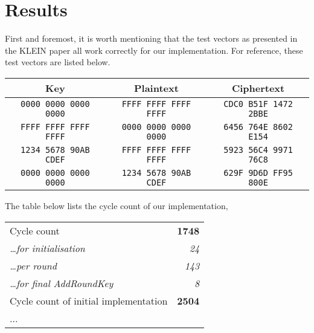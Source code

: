 \documentclass[a4paper]{article}
\begin{document}
\section{Results}

First and foremost, it is worth mentioning that the test vectors as presented in the KLEIN paper all work correctly for our implementation. For reference, these test vectors are listed below.

\begin{center}
	\begin{tabular}{c | c | c}
		\hline
		Key & Plaintext & Ciphertext \\
		\hline
	{\tt \small 0000 0000 0000 0000} & {\tt \small FFFF FFFF FFFF FFFF} & {\tt \small CDC0 B51F 1472 2BBE} \\
	{\tt \small FFFF FFFF FFFF FFFF} & {\tt \small 0000 0000 0000 0000} & {\tt \small 6456 764E 8602 E154} \\
	{\tt \small 1234 5678 90AB CDEF} & {\tt \small FFFF FFFF FFFF FFFF} & {\tt \small 5923 56C4 9971 76C8} \\
	{\tt \small 0000 0000 0000 0000} & {\tt \small 1234 5678 90AB CDEF} & {\tt \small 629F 9D6D FF95 800E} \\
		\hline
	\end{tabular}
\end{center}

The table below lists the cycle count of our implementation, %

\begin{center}
	\begin{tabular}{l r}
		\hline
		Cycle count & \textbf{1748} \\
		\hspace{1em} \emph{\dots for initialisation} & \emph{24} \\
		\hspace{1em} \emph{\dots per round} & \emph{143} \\
		\hspace{1em} \emph{\dots for final AddRoundKey} & \emph{8} \\
		\hline
		Cycle count of initial implementation & \textbf{2504} \\
		\hline
		...
		\hline
	\end{tabular}
\end{center}



\end{document}
